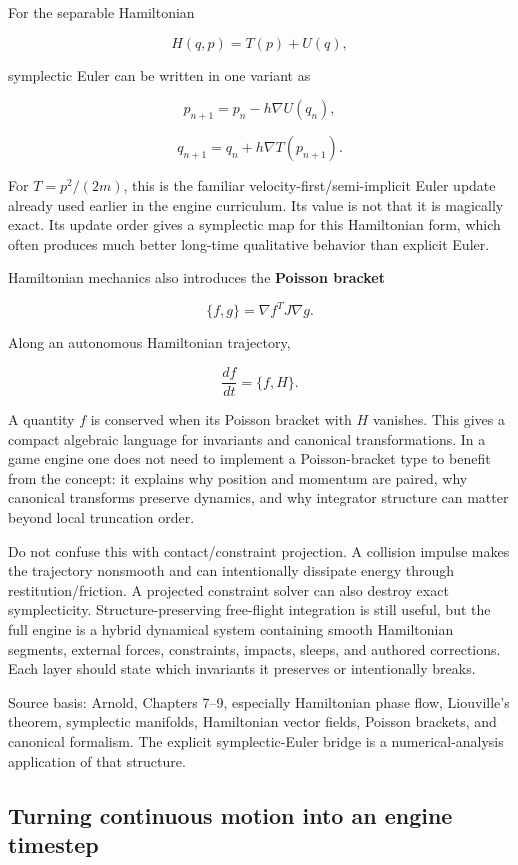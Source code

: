 For the separable Hamiltonian

\[
H(q,p)=T(p)+U(q),
\]

symplectic Euler can be written in one variant as

\[
p_{n+1}
=
p_n-h\nabla U(q_n),
\]

\[
q_{n+1}
=
q_n+h\nabla T(p_{n+1}).
\]

For \(T=p^2/(2m)\), this is the familiar velocity-first/semi-implicit Euler update already used earlier in the engine curriculum. Its value is not that it is magically exact. Its update order gives a symplectic map for this Hamiltonian form, which often produces much better long-time qualitative behavior than explicit Euler.

Hamiltonian mechanics also introduces the \textbf{Poisson bracket}

\[
\{f,g\}
=
\nabla f^T J\nabla g.
\]

Along an autonomous Hamiltonian trajectory,

\[
\frac{df}{dt}
=
\{f,H\}.
\]

A quantity \(f\) is conserved when its Poisson bracket with \(H\) vanishes. This gives a compact algebraic language for invariants and canonical transformations. In a game engine one does not need to implement a Poisson-bracket type to benefit from the concept: it explains why position and momentum are paired, why canonical transforms preserve dynamics, and why integrator structure can matter beyond local truncation order.

Do not confuse this with contact/constraint projection. A collision impulse makes the trajectory nonsmooth and can intentionally dissipate energy through restitution/friction. A projected constraint solver can also destroy exact symplecticity. Structure-preserving free-flight integration is still useful, but the full engine is a hybrid dynamical system containing smooth Hamiltonian segments, external forces, constraints, impacts, sleeps, and authored corrections. Each layer should state which invariants it preserves or intentionally breaks.

Source basis: Arnold, Chapters 7--9, especially Hamiltonian phase flow, Liouville's theorem, symplectic manifolds, Hamiltonian vector fields, Poisson brackets, and canonical formalism. The explicit symplectic-Euler bridge is a numerical-analysis application of that structure.

\subsection{Turning continuous motion into an engine timestep}\label{02-foundations-ii-ch039-turning-continuous-motion-into-an-engine-timestep}

